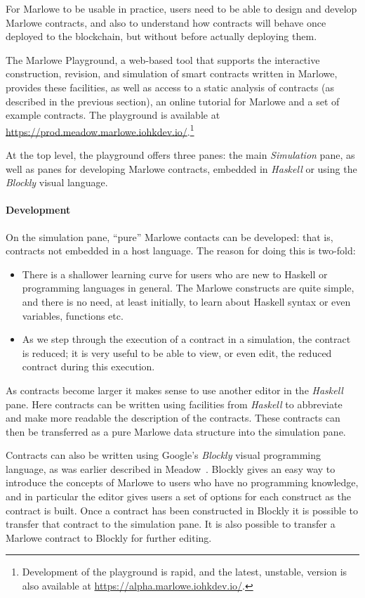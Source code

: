 \documentclass[runningheads]{llncs}
\begin{document}
For Marlowe to be usable in practice, users need to be able to design and develop Marlowe contracts, and also to understand how contracts will behave once deployed to the blockchain, but without before actually deploying them.

The Marlowe Playground, a web-based tool that supports the interactive construction, revision, and simulation of smart contracts written in Marlowe, provides these facilities, as well as access to a static analysis of contracts (as described in the previous section), an online tutorial for Marlowe and a set of example contracts. The playground is available at \url{https://prod.meadow.marlowe.iohkdev.io/}.\footnote{Development of the playground is rapid, and the latest, unstable, version is also available at \url{https://alpha.marlowe.iohkdev.io/}.}

At the top level, the playground offers three panes: the main \emph{Simulation} pane, as well as panes for developing Marlowe contracts, embedded in \emph{Haskell} or using the \emph{Blockly} visual language.

\paragraph{Development}

On the simulation pane, ``pure'' Marlowe contacts can be developed: that is, contracts not embedded in a host language. The reason for doing this is two-fold:
\begin{itemize}
    \item There is a shallower learning curve for users who are new to Haskell or programming languages in general. The Marlowe constructs are quite simple, and there is no need, at least initially, to learn about Haskell syntax or even variables, functions etc.
    \item As we step through the execution of a contract in a simulation, the contract is reduced; it is very useful to be able to view, or even edit, the reduced contract during this execution.
\end{itemize}
As contracts become larger it makes sense to use another editor in the \emph{Haskell} pane. Here contracts can be written using facilities from \emph{Haskell} to abbreviate and make more readable the description of the contracts. These contracts can then be transferred as a pure Marlowe data structure into the simulation pane.

Contracts can also be written using Google's \emph{Blockly} visual programming language, as was earlier described in Meadow~\cite{isola-marlowe}. Blockly gives an easy way to introduce the concepts of Marlowe to users who have no programming knowledge, and in particular the editor gives users a set of options for each construct as the contract is built. Once a contract has been constructed in Blockly it is possible to transfer that contract to the simulation pane.%
It is also possible to transfer a Marlowe contract to Blockly for further editing.
\end{document}
